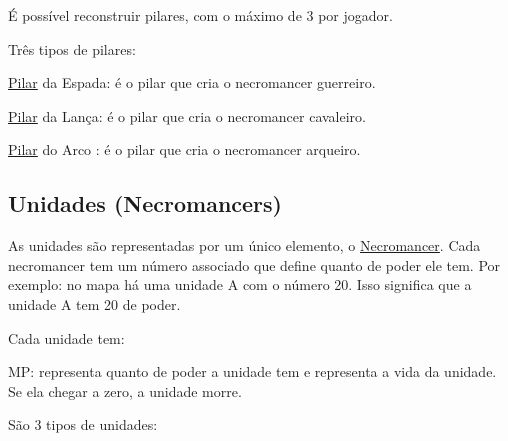 É possível reconstruir pilares, com o máximo de 3 por jogador.

Três tipos de pilares\+:
\begin{DoxyItemize}
\item \mbox{\hyperlink{class_pilar}{Pilar}} da Espada\+: é o pilar que cria o necromancer guerreiro.
\item \mbox{\hyperlink{class_pilar}{Pilar}} da Lança\+: é o pilar que cria o necromancer cavaleiro.
\item \mbox{\hyperlink{class_pilar}{Pilar}} do Arco \+: é o pilar que cria o necromancer arqueiro.
\end{DoxyItemize}

\subsection*{Unidades (Necromancers)}

As unidades são representadas por um único elemento, o \mbox{\hyperlink{class_necromancer}{Necromancer}}. Cada necromancer tem um número associado que define quanto de poder ele tem. Por exemplo\+: no mapa há uma unidade A com o número 20. Isso significa que a unidade A tem 20 de poder.

Cada unidade tem\+:
\begin{DoxyItemize}
\item MP\+: representa quanto de poder a unidade tem e representa a vida da unidade. Se ela chegar a zero, a unidade morre.
\end{DoxyItemize}

São 3 tipos de unidades\+:



